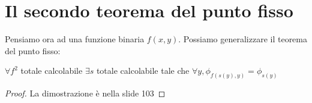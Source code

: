 \section{Il secondo teorema del punto fisso}

Pensiamo ora ad una funzione binaria $f(x,y)$. Possiamo generalizzare il teorema del punto fisso:
\begin{thm}
    $\forall f^{2}$ totale calcolabile $\exists s$ totale calcolabile tale che $\forall y, \phi_{f(s(y),y)} = \phi_{s(y)}$
\end{thm}
\begin{proof}
    La dimostrazione è nella slide 103
\end{proof}
